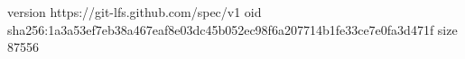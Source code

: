 version https://git-lfs.github.com/spec/v1
oid sha256:1a3a53ef7eb38a467eaf8e03dc45b052ec98f6a207714b1fe33ce7e0fa3d471f
size 87556
